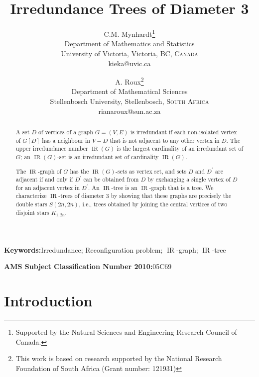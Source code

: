 \documentclass[12pt]{article}%
\begin{document}
\title{\textbf{Irredundance Trees of Diameter }$\mathbf{3}$}
\author{C.M. Mynhardt\thanks{Supported by the Natural Sciences and Engineering
Research Council of Canada.}\\Department of Mathematics and Statistics\\University of Victoria, Victoria, BC, \textsc{Canada}\\{\small kieka@uvic.ca}
\and A. Roux\thanks{This work is based on research supported by the National
Research Foundation of South Africa (Grant number: 121931)}\\Department of Mathematical Sciences\\Stellenbosch University, Stellenbosch, \textsc{South Africa}\\{\small rianaroux@sun.ac.za}}
\maketitle

\begin{abstract}
A set $D$ of vertices of a graph $G=(V,E)$ is irredundant if each non-isolated
vertex of $G[D]$ has a neighbour in $V-D$ that is not adjacent to any other
vertex in $D$. The upper irredundance number $\operatorname{IR}(G)$ is the
largest cardinality of an irredundant set of $G$; an $\operatorname{IR}%
(G)$-set is an irredundant set of cardinality $\operatorname{IR}(G)$.

The $\operatorname{IR}$-graph of $G$ has the $\operatorname{IR}(G)$-sets as
vertex set, and sets $D$ and $D^{\prime}$ are adjacent if and only if
$D^{\prime}$ can be obtained from $D$ by exchanging a single vertex of $D$ for
an adjacent vertex in $D^{\prime}$. An $\operatorname{IR}$-tree is an
$\operatorname{IR}$-graph that is a tree. We characterize $\operatorname{IR}%
$-trees of diameter $3$ by showing that these graphs are precisely the double
stars $S(2n,2n)$, i.e., trees obtained by joining the central vertices of two
disjoint stars $K_{1,2n}$.

\end{abstract}

\noindent\textbf{Keywords:\hspace{0.1in}}Irredundance; Reconfiguration
problem; $\operatorname{IR}$-graph; $\operatorname{IR}$-tree

\noindent\textbf{AMS Subject Classification Number 2010:\hspace{0.1in}}05C69

\section{Introduction}
\end{document}
